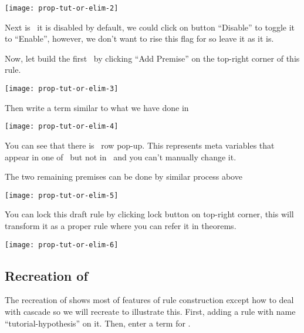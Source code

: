 \documentclass[master.tex]{subfiles}
\begin{document}
\begin{center}
  \texttt{[image: prop-tut-or-elim-2]}
\end{center}

Next is \kAllowReduction\, it is disabled by default, we could click on button
``Disable'' to toggle it to ``Enable'', however, we don't want to rise this flag
for  so leave it as it is.

Now, let build the first \kPremise\ by clicking ``Add Premise'' on the top-right
corner of this rule.

\begin{center}
  \texttt{[image: prop-tut-or-elim-3]}
\end{center}

Then write a term similar to what we have done in \kConclusion\

\begin{center}
  \texttt{[image: prop-tut-or-elim-4]}
\end{center}

You can see that there is \kParameter\ row pop-up. This represents meta
variables that appear in one of \kPremise\ but not in \kConclusion\ and you can't
manually change it.

The two remaining premises can be done by similar process above

\begin{center}
  \texttt{[image: prop-tut-or-elim-5]}
\end{center}

You can lock this draft rule by clicking lock button on top-right corner,
this will transform it as a proper rule where you can refer it in theorems.

\begin{center}
  \texttt{[image: prop-tut-or-elim-6]}
\end{center}

\newpage

\subsection{Recreation of }

The recreation of  shows most of features of rule construction
except how to deal with cascade so we will recreate  to
illustrate this. First, adding a rule with name ``tutorial-hypothesis'' on it.
Then, enter a term for \kConclusion.
\end{document}
